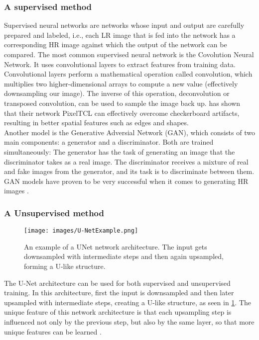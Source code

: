 \documentclass[letterpaper, 10 pt, conference]{ieeeconf}  %
\begin{document}
\subsubsection{A supervised method}
Supervised neural networks are networks whose input and output are carefully prepared and labeled, 
i.e., each LR image that is fed into the network has a corresponding HR image against which the output of the network can be compared.
The most common supervised neural network is the Covolution Neural Network.
It uses convolutional layers to extract features from training data. 
Convolutional layers perform a mathematical operation called convolution, which multiplies two higher-dimensional arrays to compute a new value (effectively downsampling our image).
The inverse of this operation, deconvolution or transposed convolution, can be used to sample the image back up.
\textcite{Gao2020PixelTC} has shown that their network PixelTCL can effectively overcome checkerboard artifacts, resulting in better spatial features such as edges and shapes.
\\
Another model is the Generative Adversial Network (GAN), which consists of two main components: a generator and a discriminator.
Both are trained simultaneously: 
The generator has the task of generating an image that the discriminator takes as a real image.
The discriminator receives a mixture of real and fake images from the generator, and its task is to discriminate between them.
GAN models have proven to be very successful when it comes to generating HR images \cite{Sharma2020HighresolutionID}.

\subsubsection{A Unsupervised method}

\begin{figure}[!ht]
    \caption{An example of a UNet network architecture. 
    The input gets downsampled with intermediate steps and then again upsampled, forming a U-like structure.}
    \centering
    \texttt{[image: images/U-NetExample.png]}
    \label{fig:unet}
\end{figure}
The U-Net architecture can be used for both supervised and unsupervised training. 
In this architecture, first the input is downsampled and then later upsampled with intermediate steps, creating a U-like structure, as seen in \ref{fig:unet}.
The unique feature of this network architecture is that each upsampling step is influenced not only by the previous step, but also by the same layer, so that more unique features can be learned \cite{Sharma2022ADL}.
\end{document}
